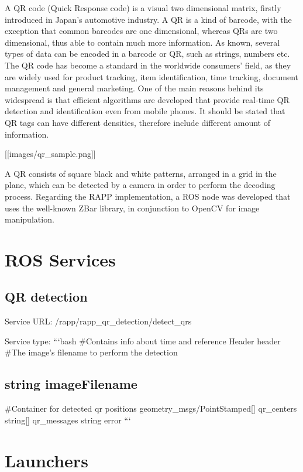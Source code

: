 A Q\-R code (Quick Response code) is a visual two dimensional matrix, firstly introduced in Japan’s automotive industry. A Q\-R is a kind of barcode, with the exception that common barcodes are one dimensional, whereas Q\-Rs are two dimensional, thus able to contain much more information. As known, several types of data can be encoded in a barcode or Q\-R, such as strings, numbers etc. The Q\-R code has become a standard in the worldwide consumers’ field, as they are widely used for product tracking, item identification, time tracking, document management and general marketing. One of the main reasons behind its widespread is that efficient algorithms are developed that provide real-\/time Q\-R detection and identification even from mobile phones. It should be stated that Q\-R tags can have different densities, therefore include different amount of information.

\mbox{[}\mbox{[}images/qr\-\_\-sample.\-png\mbox{]}\mbox{]}

A Q\-R consists of square black and white patterns, arranged in a grid in the plane, which can be detected by a camera in order to perform the decoding process. Regarding the R\-A\-P\-P implementation, a R\-O\-S node was developed that uses the well-\/known Z\-Bar library, in conjunction to Open\-C\-V for image manipulation.

\section*{R\-O\-S Services}

\subsection*{Q\-R detection}

Service U\-R\-L\-: {\ttfamily /rapp/rapp\-\_\-qr\-\_\-detection/detect\-\_\-qrs}

Service type\-: ```bash \#\-Contains info about time and reference Header header \#\-The image's filename to perform the detection \subsection*{string image\-Filename }

\#\-Container for detected qr positions geometry\-\_\-msgs/\-Point\-Stamped\mbox{[}\mbox{]} qr\-\_\-centers string\mbox{[}\mbox{]} qr\-\_\-messages string error ```

\section*{Launchers}

